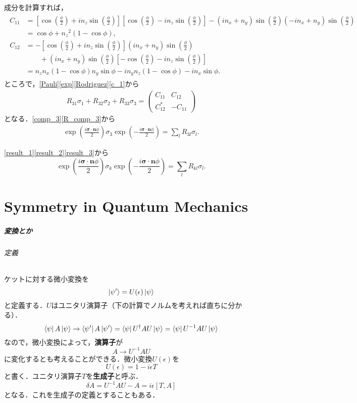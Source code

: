 \documentclass[a4paper]{ltjsreport}
\begin{document}
成分を計算すれば，
\begin{align}
  \begin{split}
    C_{11} & = \left[\cos\left(\frac{\phi}{2}\right)+in_z\sin\left(\frac{\phi}{2}\right)\right]\left[\cos\left(\frac{\phi}{2}\right)-in_z\sin\left(\frac{\phi}{2}\right)\right]-(in_x+n_y)\sin\left(\frac{\phi}{2}\right)(-in_x+n_y)\sin\left(\frac{\phi}{2}\right)\\
    & = \cos\phi+n_z{}^2(1-\cos\phi),\\
    C_{12} & = -\left[\cos\left(\frac{\phi}{2}\right)+in_z\sin\left(\frac{\phi}{2}\right)\right](in_x+n_y)\sin\left(\frac{\phi}{2}\right) \\
    &\qquad + (in_x+n_y)\sin\left(\frac{\phi}{2}\right)\left[-\cos\left(\frac{\phi}{2}\right)-in_z\sin\left(\frac{\phi}{2}\right)\right]\\
    & = n_zn_x(1-\cos\phi)n_y\sin\phi-in_yn_z(1-\cos\phi)-in_x\sin\phi.
  \end{split}
  \label{c_1}
\end{align}
ところで，\eqref{Pauli}\eqref{exp}\eqref{Rodriguez}\eqref{c_1}から
\begin{align}
  R_{31}\sigma_1+R_{32}\sigma_2+R_{33}\sigma_3 =
  \begin{pmatrix}
    C_{11} & C_{12} \\
    C_{12}^* & -C_{11}
  \end{pmatrix}
  \label{R_comp_3}
\end{align}
となる．\eqref{comp_3}\eqref{R_comp_3}から
\begin{align}
  \exp\left(\frac{i\boldsymbol{\sigma}\cdot\boldsymbol{n}\phi}{2}\right)\sigma_3\exp\left(-\frac{i\boldsymbol{\sigma}\cdot\boldsymbol{n}\phi}{2}\right)=\sum_lR_{3l}\sigma_l.\label{result_3}
\end{align}

\eqref{result_1}\eqref{result_2}\eqref{result_3}から
\[\exp\left(\frac{i\boldsymbol{\sigma}\cdot\boldsymbol{n}\phi}{2}\right)\sigma_k\exp\left(-\frac{i\boldsymbol{\sigma}\cdot\boldsymbol{n}\phi}{2}\right)=\sum_lR_{kl}\sigma_l.\]

\chapter{Symmetry in Quantum Mechanics}
\paragraph{変換とか}
\subparagraph{定義}
ケットに対する微小変換を
\[ \ket{\psi'} = U(\epsilon) \ket{\psi} \]
と定義する．$U$はユニタリ演算子（下の計算でノルムを考えれば直ちに分かる）．
\[ \bra{\psi} A \ket{\psi} \to \bra{\psi'} A \ket{\psi'} = \bra{\psi} U^\dagger A U \ket{\psi} = \bra{\psi} U^{-1} A U \ket{\psi} \]
なので，微小変換によって，\textbf{演算子}が
\[ A \to U^{-1} A U \]
に変化するとも考えることができる．微小変換$U(\epsilon)$を
\[ U(\epsilon) = 1 - i \epsilon T \]
と書く．ユニタリ演算子$T$を\textbf{生成子}と呼ぶ．
\[ \delta A = U^{-1} A U - A = i \epsilon [T, A] \]
となる．これを生成子の定義とすることもある．
\end{document}
